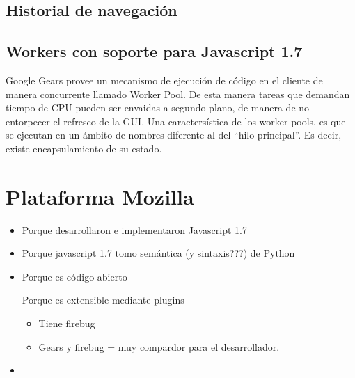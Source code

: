 \documentclass[a4paper]{report}
\begin{document}
\section{Historial de navegación}

\section{Workers con soporte para Javascript 1.7}
Google Gears provee un mecanismo de ejecución de código en el cliente de manera
concurrente llamado Worker Pool. De esta manera tareas que demandan tiempo de
CPU pueden ser envaidas a segundo plano, de manera de no entorpecer el refresco 
de la GUI.
Una caractersística de los worker pools, es que se ejecutan en un ámbito de 
nombres diferente al del ``hilo principal''. Es decir, existe encapsulamiento
de su estado.
 
\appendix




\chapter{Plataforma Mozilla}
\begin{itemize}
  \item Porque desarrollaron e implementaron Javascript 1.7
  \item Porque javascript 1.7 tomo semántica (y sintaxis???) de Python
  \item Porque es código abierto
  \begin{item}
  	Porque es extensible mediante plugins
  	\begin{itemize}
        \item Tiene firebug
        \item Gears y firebug = muy compardor para el desarrollador.
     \end{itemize}
      
  \end{item}
  \item 
\end{itemize}

\begin{thebibliography}{99}
 
\end{thebibliography}

\printglossary
{}
\end{document}
